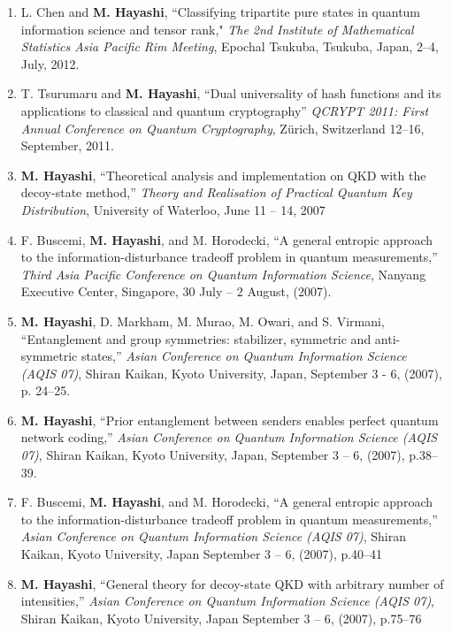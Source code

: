 \documentclass[a4paper,12pt,oneside]{article}
\begin{document}
\begin{enumerate}
\item 
L. Chen and \textbf{M. Hayashi}, 
``Classifying tripartite pure states in quantum information science and tensor rank," 
{\em The 2nd Institute of Mathematical Statistics Asia Pacific Rim Meeting}, 
Epochal Tsukuba, Tsukuba, Japan, 2--4, July, 2012.

\item 
T. Tsurumaru and \textbf{M. Hayashi}, ``Dual universality of hash functions and its applications to classical and quantum cryptography'' 
{\em QCRYPT 2011: First Annual Conference on Quantum Cryptography}, 
Z\"{u}rich, Switzerland 12--16, September, 2011.

\item
\textbf{M. Hayashi}, ``Theoretical analysis and implementation on QKD with the decoy-state method,'' 
{\em Theory and Realisation of Practical Quantum Key Distribution}, 
University of Waterloo, June 11 -- 14, 2007

\item
F. Buscemi, \textbf{M. Hayashi}, and M. Horodecki, ``A general entropic approach to the information-disturbance tradeoff problem in quantum measurements,'' 
{\em Third Asia Pacific Conference on Quantum Information Science}, 
Nanyang Executive Center, Singapore, 
30 July -- 2 August, (2007).

\item
\textbf{M. Hayashi}, D. Markham, M. Murao, M. Owari, and S. Virmani, ``Entanglement and group symmetries: stabilizer, symmetric and anti-symmetric states,'' 
{\em Asian Conference on Quantum Information Science (AQIS 07)}, 
Shiran Kaikan, Kyoto University, Japan, September 3 - 6, (2007), p. 24--25.

\item
\textbf{M. Hayashi}, ``Prior entanglement between senders enables perfect quantum network coding,'' {\em Asian Conference on Quantum Information Science (AQIS 07)}, 
Shiran Kaikan, Kyoto University, Japan, 
September 3 -- 6, (2007), p.38--39.

\item
F. Buscemi, \textbf{M. Hayashi}, and M. Horodecki, ``A general entropic approach to the information-disturbance tradeoff problem in quantum measurements,'' 
{\em Asian Conference on Quantum Information Science (AQIS 07)}, 
Shiran Kaikan, Kyoto University, Japan September 3 -- 6, (2007), p.40--41

\item
\textbf{M. Hayashi}, ``General theory for decoy-state QKD with arbitrary number of intensities,'' 
{\em Asian Conference on Quantum Information Science (AQIS 07)}, 
Shiran Kaikan, Kyoto University, Japan September 3 -- 6, (2007), p.75--76


\end{enumerate}
\end{document}
